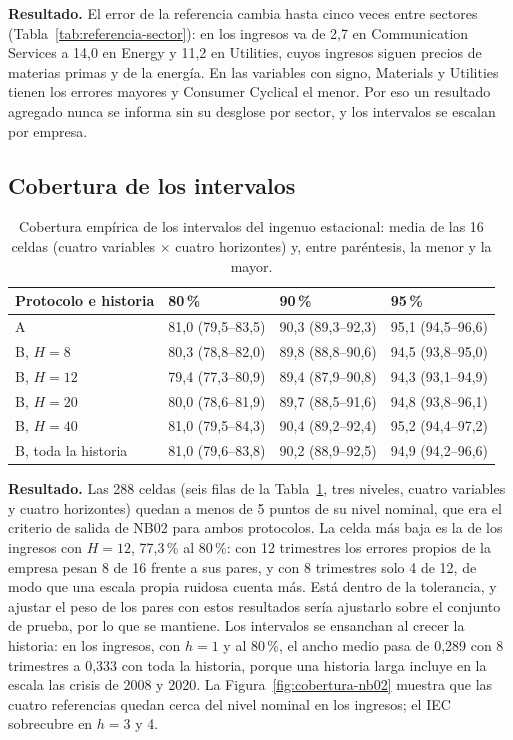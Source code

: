 \documentclass[12pt,letterpaper,oneside]{report}
\renewcommand{\_}{\UnderscoreOriginal\allowbreak}
\begin{document}
\textbf{Resultado.} El error de la referencia cambia hasta cinco veces entre sectores (Tabla~\ref{tab:referencia-sector}): en los ingresos va de 2,7 en Communication Services a 14,0 en Energy y 11,2 en Utilities, cuyos ingresos siguen precios de materias primas y de la energía. En las variables con signo, Materials y Utilities tienen los errores mayores y Consumer Cyclical el menor. Por eso un resultado agregado nunca se informa sin su desglose por sector, y los intervalos se escalan por empresa.

\subsection{Cobertura de los intervalos}

\begin{table}[H]
\centering
\caption{Cobertura empírica de los intervalos del ingenuo estacional: media de las 16 celdas (cuatro variables $\times$ cuatro horizontes) y, entre paréntesis, la menor y la mayor.}
\label{tab:cobertura-nb02}
\small
\begin{tabular}{@{}llll@{}}
\toprule
Protocolo e historia & 80\,\% & 90\,\% & 95\,\% \\
\midrule
A & 81,0 (79,5--83,5) & 90,3 (89,3--92,3) & 95,1 (94,5--96,6) \\
B, $H = 8$ & 80,3 (78,8--82,0) & 89,8 (88,8--90,6) & 94,5 (93,8--95,0) \\
B, $H = 12$ & 79,4 (77,3--80,9) & 89,4 (87,9--90,8) & 94,3 (93,1--94,9) \\
B, $H = 20$ & 80,0 (78,6--81,9) & 89,7 (88,5--91,6) & 94,8 (93,8--96,1) \\
B, $H = 40$ & 81,0 (79,5--84,3) & 90,4 (89,2--92,4) & 95,2 (94,4--97,2) \\
B, toda la historia & 81,0 (79,6--83,8) & 90,2 (88,9--92,5) & 94,9 (94,2--96,6) \\
\bottomrule
\end{tabular}
\end{table}

\textbf{Resultado.} Las 288 celdas (seis filas de la Tabla~\ref{tab:cobertura-nb02}, tres niveles, cuatro variables y cuatro horizontes) quedan a menos de 5 puntos de su nivel nominal, que era el criterio de salida de NB02 para ambos protocolos. La celda más baja es la de los ingresos con $H = 12$, 77,3\,\% al 80\,\%: con 12 trimestres los errores propios de la empresa pesan 8 de 16 frente a sus pares, y con 8 trimestres solo 4 de 12, de modo que una escala propia ruidosa cuenta más. Está dentro de la tolerancia, y ajustar el peso de los pares con estos resultados sería ajustarlo sobre el conjunto de prueba, por lo que se mantiene. Los intervalos se ensanchan al crecer la historia: en los ingresos, con $h = 1$ y al 80\,\%, el ancho medio pasa de 0,289 con 8 trimestres a 0,333 con toda la historia, porque una historia larga incluye en la escala las crisis de 2008 y 2020. La Figura~\ref{fig:cobertura-nb02} muestra que las cuatro referencias quedan cerca del nivel nominal en los ingresos; el IEC sobrecubre en $h = 3$ y 4.
\end{document}
